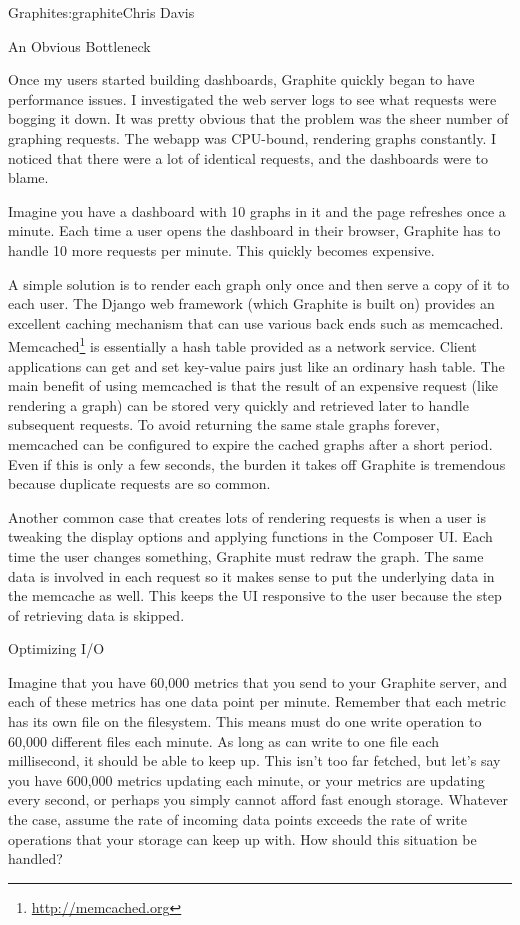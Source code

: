 \begin{aosachapter}{Graphite}{s:graphite}{Chris Davis}
\begin{aosasect1}{An Obvious Bottleneck}

Once my users started building dashboards, Graphite quickly began to
have performance issues. I investigated the web server logs to see
what requests were bogging it down. It was pretty obvious that the
problem was the sheer number of graphing requests. The webapp was
CPU-bound, rendering graphs constantly. I noticed that there were a
lot of identical requests, and the dashboards were to blame.

Imagine you have a dashboard with 10 graphs in it and the page
refreshes once a minute. Each time a user opens the dashboard in
their browser, Graphite has to handle 10 more requests per
minute. This quickly becomes expensive.

A simple solution is to render each graph only once and then serve a
copy of it to each user. The Django web framework (which Graphite is
built on) provides an excellent caching mechanism that can use various
back ends such as memcached. Memcached\footnote{\url{http://memcached.org}}
is essentially a hash table
provided as a network service. Client applications can get and set
key-value pairs just like an ordinary hash table. The main benefit of
using memcached is that the result of an expensive request (like
rendering a graph) can be stored very quickly and retrieved later to
handle subsequent requests. To avoid returning the same stale graphs
forever, memcached can be configured to expire the cached graphs after
a short period. Even if this is only a few seconds, the burden it
takes off Graphite is tremendous because duplicate requests are so
common.

Another common case that creates lots of rendering requests is when a
user is tweaking the display options and applying functions in the
Composer UI\@. Each time the user changes something, Graphite must
redraw the graph. The same data is involved in each request so it
makes sense to put the underlying data in the memcache as well.  This
keeps the UI responsive to the user because the step of retrieving
data is skipped.

\end{aosasect1}

\begin{aosasect1}{Optimizing I/O}

Imagine that you have 60,000 metrics that you send to your Graphite
server, and each of these metrics has one data point per
minute. Remember that each metric has its own  file on the
filesystem. This means  must do one write operation to 60,000
different files each minute.  As long as  can write to one file
each millisecond, it should be able to keep up. This isn't too far
fetched, but let's say you have 600,000 metrics updating each minute,
or your metrics are updating every second, or perhaps you simply
cannot afford fast enough storage. Whatever the case, assume the rate
of incoming data points exceeds the rate of write operations that your
storage can keep up with. How should this situation be handled?


\end{aosasect1}
\end{aosachapter}
